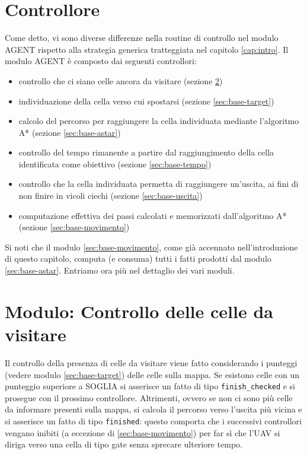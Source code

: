 \section{Controllore} \label{sec:base-controllore}
Come detto, vi sono diverse differenze nella routine di controllo nel modulo AGENT rispetto alla strategia generica tratteggiata nel capitolo \ref{cap:intro}. Il modulo AGENT è composto dai seguenti controllori:
\begin{itemize}
	\item controllo che ci siano celle ancora da visitare (sezione \ref{sec:base-finish})
	\item individuazione della cella verso cui spostarsi (sezione \ref{sec:base-target})
	\item calcolo del percorso per raggiungere la cella individuata mediante l'algoritmo A* (sezione \ref{sec:base-astar})
	\item controllo del tempo rimanente a partire dal raggiungimento della cella identificata come obiettivo (sezione \ref{sec:base-tempo})
	\item controllo che la cella individuata permetta di raggiungere un'uscita, ai fini di non finire in vicoli ciechi (sezione \ref{sec:base-uscita})
	\item computazione effettiva dei passi calcolati e memorizzati dall'algoritmo A* (sezione \ref{sec:base-movimento})
\end{itemize}
Si noti che il modulo \ref{sec:base-movimento}, come già accennato nell'introduzione di questo capitolo, computa (e consuma) tutti i fatti prodotti dal modulo \ref{sec:base-astar}. Entriamo ora più nel dettaglio dei vari moduli.

\section{Modulo: Controllo delle celle da visitare} \label{sec:base-finish}
Il controllo della presenza di celle da visitare viene fatto considerando i punteggi (vedere modulo \ref{sec:base-target}) delle celle sulla mappa. Se esistono celle con un punteggio superiore a {\color{red} SOGLIA} si asserisce un fatto di tipo \texttt{finish\_checked} e si prosegue con il prossimo controllore. Altrimenti, ovvero se non ci sono più celle da informare presenti sulla mappa, si calcola il percorso verso l'uscita più vicina e si asserisce un fatto di tipo \texttt{finished}: questo comporta che i successivi controllori vengano inibiti ({\color{red}a eccezione di \ref{sec:base-movimento}}) per far sì che l'UAV si diriga verso una cella di tipo gate senza sprecare ulteriore tempo.

